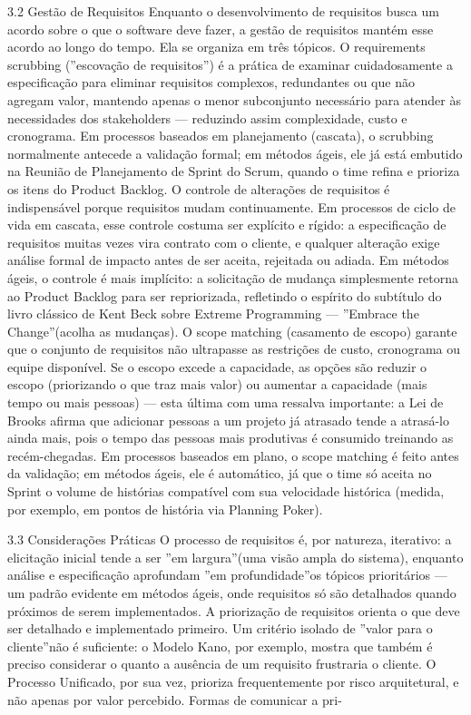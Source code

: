 3.2 Gestão de Requisitos Enquanto o desenvolvimento de requisitos busca um acordo sobre o que o software deve fazer, a gestão de requisitos mantém esse acordo ao longo do tempo. Ela se organiza em três tópicos. O requirements scrubbing (”escovação de requisitos”) é a prática de examinar cuidadosamente a especificação para eliminar requisitos complexos, redundantes ou que não agregam valor, mantendo apenas o menor subconjunto necessário para atender às necessidades dos stakeholders — reduzindo assim complexidade, custo e cronograma. Em processos baseados em planejamento (cascata), o scrubbing normalmente antecede a validação formal; em métodos ágeis, ele já está embutido na Reunião de Planejamento de Sprint do Scrum, quando o time refina e prioriza os itens do Product Backlog. O controle de alterações de requisitos é indispensável porque requisitos mudam continuamente. Em processos de ciclo de vida em cascata, esse controle costuma ser explícito e rígido: a especificação de requisitos muitas vezes vira contrato com o cliente, e qualquer alteração exige análise formal de impacto antes de ser aceita, rejeitada ou adiada. Em métodos ágeis, o controle é mais implícito: a solicitação de mudança simplesmente retorna ao Product Backlog para ser repriorizada, refletindo o espírito do subtítulo do livro clássico de Kent Beck sobre Extreme Programming — ”Embrace the Change”(acolha as mudanças). O scope matching (casamento de escopo) garante que o conjunto de requisitos não ultrapasse as restrições de custo, cronograma ou equipe disponível. Se o escopo excede a capacidade, as opções são reduzir o escopo (priorizando o que traz mais valor) ou aumentar a capacidade (mais tempo ou mais pessoas) — esta última com uma ressalva importante: a Lei de Brooks afirma que adicionar pessoas a um projeto já atrasado tende a atrasá-lo ainda mais, pois o tempo das pessoas mais produtivas é consumido treinando as recém-chegadas. Em processos baseados em plano, o scope matching é feito antes da validação; em métodos ágeis, ele é automático, já que o time só aceita no Sprint o volume de histórias compatível com sua velocidade histórica (medida, por exemplo, em pontos de história via Planning Poker).

3.3 Considerações Práticas O processo de requisitos é, por natureza, iterativo: a elicitação inicial tende a ser ”em largura”(uma visão ampla do sistema), enquanto análise e especificação aprofundam ”em profundidade”os tópicos prioritários — um padrão evidente em métodos ágeis, onde requisitos só são detalhados quando próximos de serem implementados. A priorização de requisitos orienta o que deve ser detalhado e implementado primeiro. Um critério isolado de ”valor para o cliente”não é suficiente: o Modelo Kano, por exemplo, mostra que também é preciso considerar o quanto a ausência de um requisito frustraria o cliente. O Processo Unificado, por sua vez, prioriza frequentemente por risco arquitetural, e não apenas por valor percebido. Formas de comunicar a pri-

